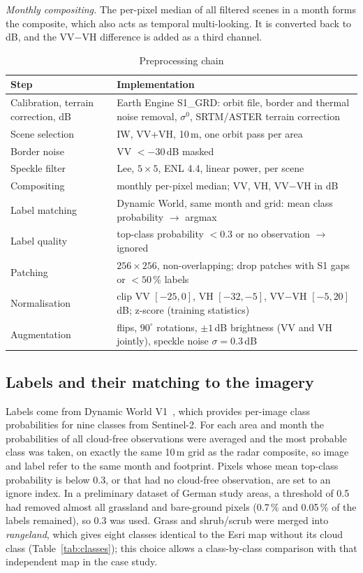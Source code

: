 \documentclass[12pt,conference]{IEEEtran}
\begin{document}
\textit{Monthly compositing.} The per-pixel median of all filtered scenes in a month forms the composite, which also
acts as temporal multi-looking. It is converted back to dB, and the VV$-$VH difference is added as a third channel.

\begin{table}[t]
\caption{Preprocessing chain}
\label{tab:prep}
\centering\footnotesize
\begin{tabular}{@{}p{2.3cm}p{5.6cm}@{}}
\toprule
Step & Implementation \\
\midrule
Calibration, terrain correction, dB & Earth Engine S1\_GRD: orbit file, border and thermal noise removal, $\sigma^0$, SRTM/ASTER terrain correction \\
Scene selection & IW, VV+VH, 10\,m, one orbit pass per area \\
Border noise & VV $<-30$\,dB masked \\
Speckle filter & Lee, $5\times5$, ENL 4.4, linear power, per scene \\
Compositing & monthly per-pixel median; VV, VH, VV$-$VH in dB \\
Label matching & Dynamic World, same month and grid: mean class probability $\rightarrow$ argmax \\
Label quality & top-class probability $<0.3$ or no observation $\rightarrow$ ignored \\
Patching & $256\times256$, non-overlapping; drop patches with S1 gaps or $<50$\,\% labels \\
Normalisation & clip VV $[-25,0]$, VH $[-32,-5]$, VV$-$VH $[-5,20]$\,dB; z-score (training statistics) \\
Augmentation & flips, $90^\circ$ rotations, $\pm1$\,dB brightness (VV and VH jointly), speckle noise $\sigma=0.3$\,dB \\
\bottomrule
\end{tabular}
\end{table}

\subsection{Labels and their matching to the imagery}

Labels come from Dynamic World V1~\cite{brown2022dynamic}, which provides per-image class probabilities for nine
classes from Sentinel-2. For each area and month the probabilities of all cloud-free observations were averaged and
the most probable class was taken, on exactly the same 10\,m grid as the radar composite, so image and label refer to
the same month and footprint. Pixels whose mean top-class probability is below 0.3, or that had no cloud-free
observation, are set to an ignore index. In a preliminary dataset of German study areas, a threshold of 0.5 had removed almost all
grassland and bare-ground pixels (0.7\,\% and 0.05\,\% of the labels remained), so 0.3 was used. Grass and shrub/scrub were merged into \emph{rangeland}, which gives eight classes identical to the
Esri map without its cloud class (Table~\ref{tab:classes}); this choice allows a class-by-class comparison with that
independent map in the case study.
\end{document}
